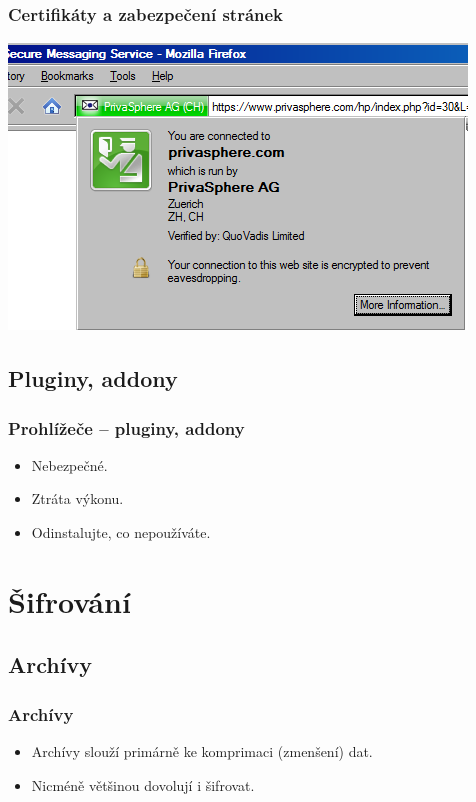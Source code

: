 \documentclass[xetex]{beamer}
\begin{document}
\begin{frame}
	\frametitle{Certifikáty a zabezpečení stránek} 
	\includegraphics[scale=0.5]{pic/firefox-trust.png}
\end{frame}

\subsection{Pluginy, addony}

\begin{frame}
	\frametitle{Prohlížeče -- pluginy, addony}
	\begin{itemize} 
   		\item Nebezpečné.
  	 	\item Ztráta výkonu.
  	 	\item Odinstalujte, co nepoužíváte.
	\end{itemize} 
\end{frame}

\section{Šifrování}

\subsection{Archívy}

\begin{frame}
	\frametitle{Archívy} 
	\begin{itemize} 
   		\item Archívy slouží primárně ke komprimaci (zmenšení) dat.
  	 	\item Nicméně většinou dovolují i šifrovat.
	\end{itemize} 
\end{frame}
\end{document}
